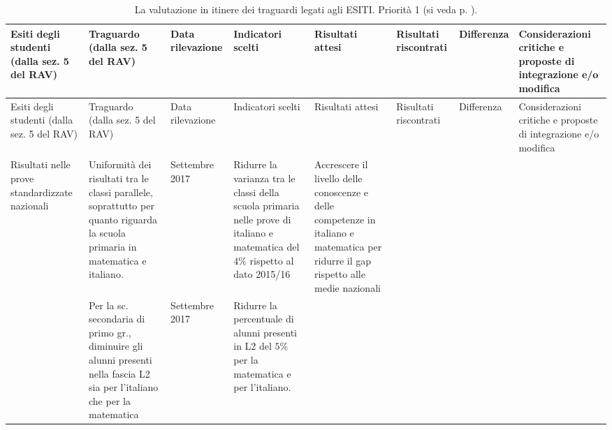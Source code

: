 \documentclass[12pt,a4paper,oneside]{memoir}
\begin{document}
\begin{footnotesize}
\begin{longtable}{|>{\raggedright}p{1.248cm}|>{\raggedright}p{1.248cm}|>{\raggedright}p{1.248cm}|>{\raggedright}p{1.248cm}|>{\raggedright}p{1.248cm}|>{\raggedright}p{1.248cm}|>{\raggedright}p{1.248cm}|>{\raggedright\arraybackslash}p{1.248cm}|}
\caption{La valutazione in itinere dei traguardi legati agli ESITI. Priorità 1 (si veda p. \pageref{priorità}).}  \label{valutazione-in-itinere1}\\
\hline
\rowcolor{violetto}
Esiti degli studenti (dalla sez. 5 del RAV)&Tra\-guar\-do (dalla sez. 5 del RAV)&Data ri\-le\-va\-zio\-ne&In\-di\-ca\-to\-ri scel\-ti&Ri\-sul\-ta\-ti at\-te\-si&Ri\-sul\-ta\-ti ris\-con\-tra\-ti&Dif\-fe\-ren\-za&Con\-si\-de\-ra\-zio\-ni cri\-ti\-che e pro\-po\-ste di in\-te\-gra\-zio\-ne e/o mo\-di\-fi\-ca\\\hline
\endfirsthead
\hline
\rowcolor{violetto}
Esiti degli studenti (dalla sez. 5 del RAV)&Tra\-guar\-do (dalla sez. 5 del RAV)&Data ri\-le\-va\-zio\-ne&In\-di\-ca\-to\-ri scel\-ti&Ri\-sul\-ta\-ti at\-te\-si&Ri\-sul\-ta\-ti ris\-con\-tra\-ti&Dif\-fe\-ren\-za&Con\-si\-de\-ra\-zio\-ni cri\-ti\-che e pro\-po\-ste di in\-te\-gra\-zio\-ne e/o mo\-di\-fi\-ca\\\hline
\endhead
\hline \multicolumn{8}{r}{\emph{Continua nella pagina successiva}}
\endfoot
\hline
\endlastfoot
Ri\-sul\-ta\-ti nelle prove standardizzate nazionali&U\-ni\-for\-mi\-tà dei risultati tra le classi parallele, soprattutto per quanto riguarda la scuola primaria in matematica e italiano.&Set\-tem\-bre 2017&Ridurre la varianza tra le classi della scuola primaria nelle prove di italiano e matematica del $4\%$ rispetto al dato 2015/16&Ac\-cre\-sce\-re il livello delle conoscenze e delle competenze in italiano e matematica per ridurre il gap rispetto alle medie nazionali&&&\\\hline
&Per la sc. secondaria di primo gr., diminuire gli alunni presenti nella fascia L2 sia per l'italiano che per la matematica&Set\-tem\-bre 2017&Ridurre la percentuale di alunni presenti in L2  del $5\%$ per la matematica e per l'italiano.&&&&\\\hline
\end{longtable}
\end{footnotesize}
\end{document}
